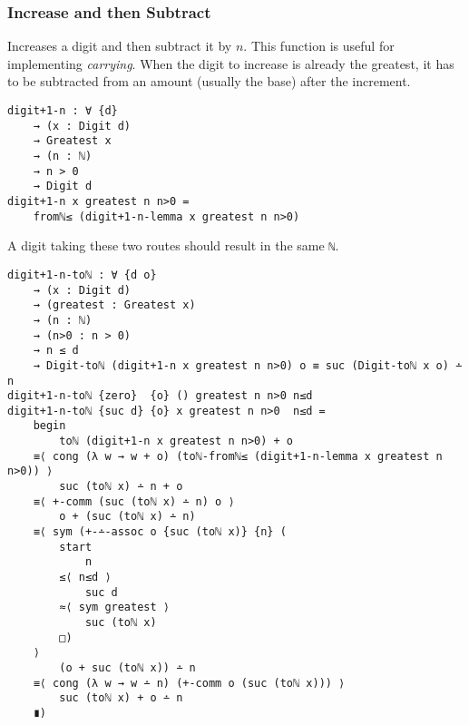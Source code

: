 \documentclass[\main/thesis.tex]{subfiles}
\begin{document}
\subsubsection{Increase and then Subtract}

Increases a digit and then subtract it by $ n $.
This function is useful for implementing \textit{carrying}.
When the digit to increase is already the greatest,
it has to be subtracted from an amount (usually the base) after the increment.

\begin{lstlisting}
digit+1-n : ∀ {d}
    → (x : Digit d)
    → Greatest x
    → (n : ℕ)
    → n > 0
    → Digit d
digit+1-n x greatest n n>0 =
    fromℕ≤ (digit+1-n-lemma x greatest n n>0)
\end{lstlisting}

\begin{center}
\end{center}

A digit taking these two routes should result in the same {{\lstinline|ℕ|}}.

\begin{lstlisting}[basicstyle=\ttfamily\scriptsize]
digit+1-n-toℕ : ∀ {d o}
    → (x : Digit d)
    → (greatest : Greatest x)
    → (n : ℕ)
    → (n>0 : n > 0)
    → n ≤ d
    → Digit-toℕ (digit+1-n x greatest n n>0) o ≡ suc (Digit-toℕ x o) ∸ n
digit+1-n-toℕ {zero}  {o} () greatest n n>0 n≤d
digit+1-n-toℕ {suc d} {o} x greatest n n>0  n≤d =
    begin
        toℕ (digit+1-n x greatest n n>0) + o
    ≡⟨ cong (λ w → w + o) (toℕ-fromℕ≤ (digit+1-n-lemma x greatest n n>0)) ⟩
        suc (toℕ x) ∸ n + o
    ≡⟨ +-comm (suc (toℕ x) ∸ n) o ⟩
        o + (suc (toℕ x) ∸ n)
    ≡⟨ sym (+-∸-assoc o {suc (toℕ x)} {n} (
        start
            n
        ≤⟨ n≤d ⟩
            suc d
        ≈⟨ sym greatest ⟩
            suc (toℕ x)
        □)
    ⟩
        (o + suc (toℕ x)) ∸ n
    ≡⟨ cong (λ w → w ∸ n) (+-comm o (suc (toℕ x))) ⟩
        suc (toℕ x) + o ∸ n
    ∎)
\end{lstlisting}
\end{document}

